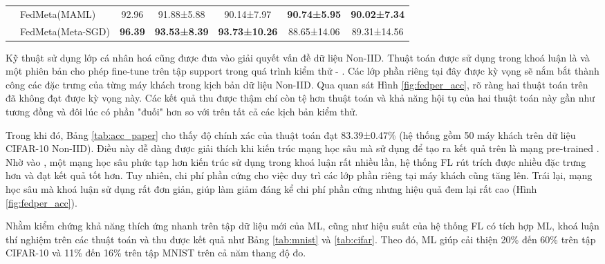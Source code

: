 \begin{table}[H]
{\begin{tabular}{c|l|ccccc}
    \multicolumn{1}{l|}{}                            & FedMeta(MAML)         & 92.96           & 91.88±5.88           & 90.14±7.97            & \textbf{90.74±5.95 } & \textbf{90.02±7.34 }  \\
    \multicolumn{1}{l|}{}                            & FedMeta(Meta-SGD)     & \textbf{96.39 } & \textbf{93.53±8.39 } & \textbf{93.73±10.26 } & 88.65±14.06          & 89.31±14.56           \\
    \bottomrule
    \end{tabular}
    }
\end{table}

Kỹ thuật sử dụng lớp cá nhân hoá cũng được đưa vào giải quyết vấn đề dữ liệu Non-IID. Thuật toán được sử dụng trong khoá luận là  và một phiên bản cho phép fine-tune trên tập support trong quá trình kiểm thử - . Các lớp phần riêng tại đây được kỳ vọng sẽ nắm bắt thành công các đặc trưng của từng máy khách trong kịch bản dữ liệu Non-IID. Qua quan sát Hình \ref{fig:fedper_acc}, rõ ràng hai thuật toán trên đã không đạt được kỳ vọng này. Các kết quả thu được thậm chí còn tệ hơn thuật toán  và khả năng hội tụ của hai thuật toán này gần như tương đồng và đôi lúc có phần "đuối" hơn so với  trên tất cả các kịch bản kiểm thử.

Trong khi đó, Bảng \ref{tab:acc_paper} cho thấy độ chính xác của thuật toán  đạt 83.39±0.47\% (hệ thống gồm 50 máy khách trên dữ liệu CIFAR-10 Non-IID). Điều này dễ dàng được giải thích khi kiến trúc mạng học sâu mà  sử dụng để tạo ra kết quả trên là mạng pre-trained  \cite{howard2017mobilenets}. Nhờ vào , một mạng học sâu phức tạp hơn kiến trúc sử dụng trong khoá luận rất nhiều lần, hệ thống FL rút trích được nhiều đặc trưng hơn và đạt kết quả tốt hơn. Tuy nhiên, chi phí phần cứng cho việc duy trì các lớp phần riêng tại máy khách cũng tăng lên. Trái lại, mạng học sâu mà khoá luận sử dụng rất đơn giản, giúp làm giảm đáng kể chi phí phần cứng nhưng hiệu quả đem lại rất cao (Hình \ref{fig:fedper_acc}).

Nhằm kiểm chứng khả năng thích ứng nhanh trên tập dữ liệu mới của ML, cũng như hiệu suất của hệ thống FL có tích hợp ML, khoá luận thí nghiệm trên các thuật toán  và thu được kết quả như Bảng \ref{tab:mnist} và \ref{tab:cifar}. Theo đó, ML giúp cải thiện 20\% đến 60\% trên tập CIFAR-10 và 11\% đến 16\% trên tập MNIST trên cả năm thang độ đo.

